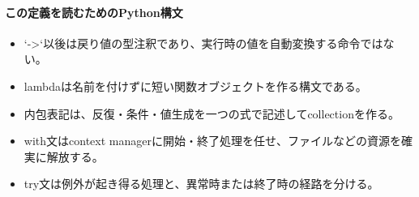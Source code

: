 \documentclass[a4paper,11pt]{article}
\begin{document}
            \paragraph{この定義を読むためのPython構文}
            \begin{itemize}[leftmargin=1.6em]
            \item `->`以後は戻り値の型注釈であり、実行時の値を自動変換する命令ではない。
\item lambdaは名前を付けずに短い関数オブジェクトを作る構文である。
\item 内包表記は、反復・条件・値生成を一つの式で記述してcollectionを作る。
\item with文はcontext managerに開始・終了処理を任せ、ファイルなどの資源を確実に解放する。
\item try文は例外が起き得る処理と、異常時または終了時の経路を分ける。
            \end{itemize}
\end{document}
